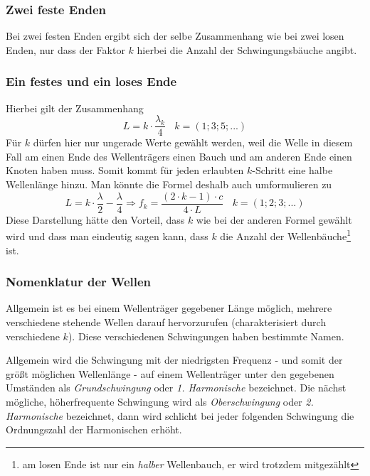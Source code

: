 \subsubsection{Zwei feste Enden}

Bei zwei festen Enden ergibt sich der selbe Zusammenhang wie bei zwei losen Enden, nur dass der Faktor \(k\) hierbei die Anzahl der Schwingungsbäuche angibt.


\subsubsection{Ein festes und ein loses Ende}

Hierbei gilt der Zusammenhang
\begin{equation}
 	L = k \cdot \frac{\lambda_k}{4} ~~~~ k = (1;3;5;...)
 	\label{eq_lose_fest}
\end{equation}
Für \(k\) dürfen hier nur ungerade Werte gewählt werden, weil die Welle in diesem Fall am einen Ende des Wellenträgers einen Bauch und am anderen Ende einen Knoten haben muss. Somit kommt für jeden erlaubten \(k\)-Schritt eine halbe Wellenlänge hinzu. Man könnte die Formel deshalb auch umformulieren zu
\begin{equation}
 	L = k \cdot \frac{\lambda}{2} - \frac{\lambda}{4} \Rightarrow f_k = \frac{(2\cdot k - 1) \cdot c}{4 \cdot L} ~~~~ k = (1;2;3;...)
\end{equation}
Diese Darstellung hätte den Vorteil, dass \(k\) wie bei der anderen Formel gewählt wird und dass man eindeutig sagen kann, dass \(k\) die Anzahl der Wellenbäuche\footnote{am losen Ende ist nur ein \emph{halber} Wellenbauch, er wird trotzdem mitgezählt} ist.


\subsubsection{Nomenklatur der Wellen}


Allgemein ist es bei einem Wellenträger gegebener Länge möglich, mehrere verschiedene stehende Wellen darauf hervorzurufen (charakterisiert durch verschiedene \(k\)). Diese verschiedenen Schwingungen haben bestimmte Namen.

Allgemein wird die Schwingung mit der niedrigsten Frequenz - und somit der größt möglichen Wellenlänge - auf einem Wellenträger unter den gegebenen Umständen als \emph{Grundschwingung} oder \emph{1. Harmonische} bezeichnet. Die nächst mögliche, höherfrequente Schwingung wird als \emph{Oberschwingung} oder \emph{2. Harmonische} bezeichnet, dann wird schlicht bei jeder folgenden Schwingung die Ordnungszahl der Harmonischen erhöht.

